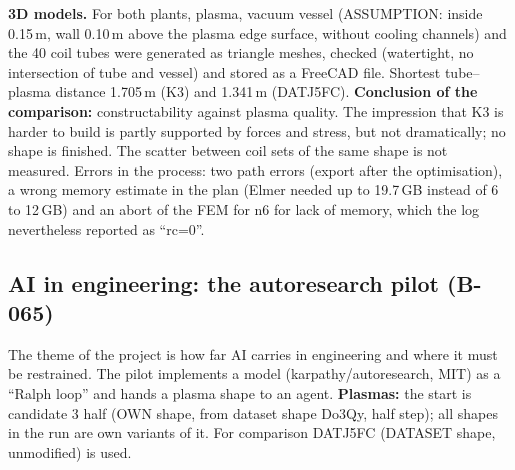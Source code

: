\textbf{3D models.} For both plants, plasma, vacuum vessel (ASSUMPTION: inside 0.15\,m, wall 0.10\,m above the plasma edge surface, without cooling channels) and the 40 coil tubes were generated as triangle meshes, checked (watertight, no intersection of tube and vessel) and stored as a FreeCAD file.
Shortest tube--plasma distance 1.705\,m (K3) and 1.341\,m (DATJ5FC).
\textbf{Conclusion of the comparison:} constructability against plasma quality. The impression that K3 is harder to build is partly supported by forces and stress, but not dramatically; no shape is finished. The scatter between coil sets of the same shape is not measured. Errors in the process: two path errors (export after the optimisation), a wrong memory estimate in the plan
(Elmer needed up to 19.7\,GB instead of 6 to 12\,GB) and an abort of the FEM for n6 for lack of memory, which the log nevertheless reported as ``rc=0''.

\subsection{AI in engineering: the autoresearch pilot (B-065)}\label{sec:autoresearch}
The theme of the project is how far AI carries in engineering and where it must be restrained. The pilot implements a model (karpathy/autoresearch, MIT) as a ``Ralph loop'' and hands a plasma shape to an agent.
\textbf{Plasmas:} the start is candidate 3 half (OWN shape, from dataset shape Do3Qy, half step); all shapes in the run are own variants of it. For comparison DATJ5FC (DATASET shape, unmodified) is used.

